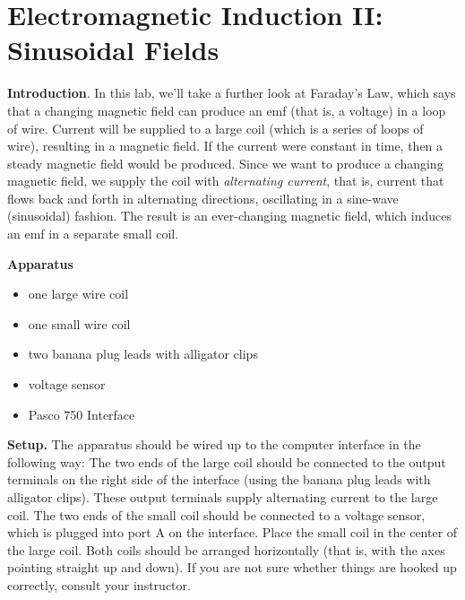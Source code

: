 
\section{Electromagnetic Induction II: Sinusoidal Fields}

\makelabheader %

\bigskip
\bigskip
\bigskip


\textbf{Introduction}.
In this lab, we'll take a further look at Faraday's Law, which says
that a changing magnetic field can produce an emf (that is, a voltage)
in a loop of wire.  Current will be supplied to a large coil (which is a 
series of loops of wire), resulting in a magnetic field.  
If the current were constant in time,
then a steady magnetic field would be produced.  Since we want to
produce a changing magnetic field, we supply the coil with {\it
alternating current}, that is, current that flows back and forth in
alternating directions, oscillating in a sine-wave (sinusoidal) fashion.  The
result is an ever-changing magnetic field, which induces an emf in
a separate small coil.

\textbf{Apparatus}

\begin{itemize}

\item one large wire coil

\item one small wire coil

\item two banana plug leads with alligator clips

\item voltage sensor

\item Pasco 750 Interface

\end{itemize}

{\bf Setup.} The apparatus should be wired up to the computer interface in the 
following way: The two ends of the large coil should be connected to the output
terminals on the right side of the interface (using the banana plug leads with 
alligator clips). These output terminals supply alternating current to the 
large coil. The two ends of the small coil should be connected to a voltage 
sensor, which is plugged into port A on the interface. Place the small coil in 
the center of the large coil. Both coils should be arranged horizontally (that 
is, with the axes pointing straight up and down). If you are not sure whether 
things are hooked up correctly, consult your instructor.

